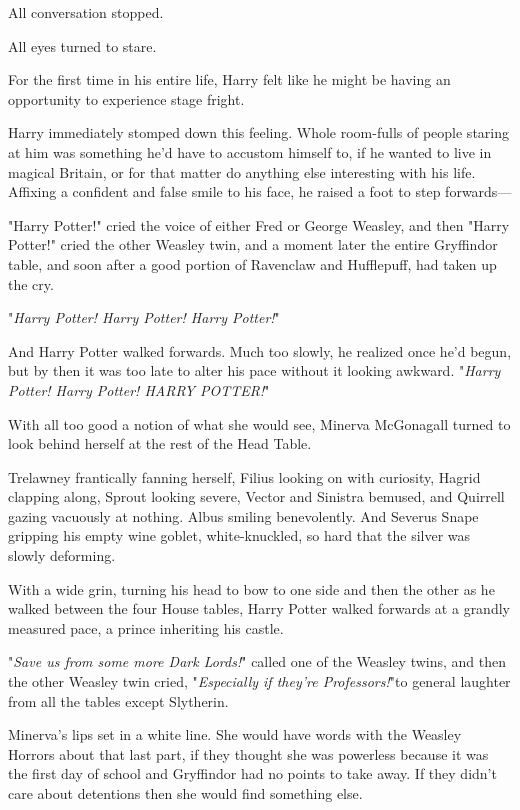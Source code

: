 All conversation stopped.

All eyes turned to stare.

For the first time in his entire life, Harry felt like he might be having an 
opportunity to experience stage fright.

Harry immediately stomped down this feeling. Whole room-fulls of people staring 
at him was something he'd have to accustom himself to, if he wanted to live in 
magical Britain, or for that matter do anything else interesting with his life. 
Affixing a confident and false smile to his face, he raised a foot to step 
forwards---

"Harry Potter!" cried the voice of either Fred or George Weasley, and then 
"Harry Potter!" cried the other Weasley twin, and a moment later the entire 
Gryffindor table, and soon after a good portion of Ravenclaw and Hufflepuff, 
had taken up the cry.

"\emph{Harry Potter! Harry Potter! Harry Potter!}"

And Harry Potter walked forwards. Much too slowly, he realized once he'd begun, 
but by then it was too late to alter his pace without it looking awkward.
\sbreak
"\emph{Harry Potter! Harry Potter! HARRY POTTER!}"

With all too good a notion of what she would see, Minerva McGonagall turned to 
look behind herself at the rest of the Head Table.

Trelawney frantically fanning herself, Filius looking on with curiosity, Hagrid 
clapping along, Sprout looking severe, Vector and Sinistra bemused, and 
Quirrell gazing vacuously at nothing. Albus smiling benevolently. And Severus 
Snape gripping his empty wine goblet, white-knuckled, so hard that the silver 
was slowly deforming.

With a wide grin, turning his head to bow to one side and then the other as he 
walked between the four House tables, Harry Potter walked forwards at a grandly 
measured pace, a prince inheriting his castle.

"\emph{Save us from some more Dark Lords!}" called one of the Weasley twins, 
and then the other Weasley twin cried, "\emph{Especially if they're 
Professors!}"to general laughter from all the tables except Slytherin.

Minerva's lips set in a white line. She would have words with the Weasley 
Horrors about that last part, if they thought she was powerless because it was 
the first day of school and Gryffindor had no points to take away. If they 
didn't care about detentions then she would find something else.

